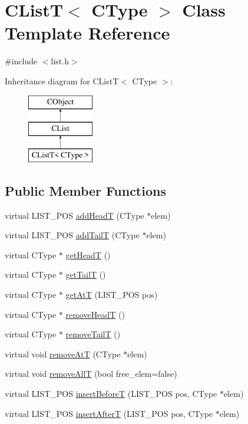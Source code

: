 \hypertarget{class_c_list_t}{\section{C\-List\-T$<$ C\-Type $>$ Class Template Reference}
\label{class_c_list_t}
}


{\ttfamily \#include $<$list.\-h$>$}

Inheritance diagram for C\-List\-T$<$ C\-Type $>$\-:\begin{figure}[H]
\begin{center}
\leavevmode
\includegraphics[height=3.000000cm]{da/d59/class_c_list_t}
\end{center}
\end{figure}
\subsection*{Public Member Functions}
\begin{DoxyCompactItemize}
\item 
virtual L\-I\-S\-T\-\_\-\-P\-O\-S \hyperlink{class_c_list_t_a1135a93b349ac4ae024e45b8fbdc2842}{add\-Head\-T} (C\-Type $\ast$elem)
\item 
virtual L\-I\-S\-T\-\_\-\-P\-O\-S \hyperlink{class_c_list_t_a580d6fa5153806358134cda4fdd7810e}{add\-Tail\-T} (C\-Type $\ast$elem)
\item 
virtual C\-Type $\ast$ \hyperlink{class_c_list_t_a4645ce0c83fb57db7b7c7b5baeff73ec}{get\-Head\-T} ()
\item 
virtual C\-Type $\ast$ \hyperlink{class_c_list_t_a3084c493b524681a3bc40be808bc5b93}{get\-Tail\-T} ()
\item 
virtual C\-Type $\ast$ \hyperlink{class_c_list_t_a18acff60ba234e5f4e6728be0c66a171}{get\-At\-T} (L\-I\-S\-T\-\_\-\-P\-O\-S pos)
\item 
virtual C\-Type $\ast$ \hyperlink{class_c_list_t_a8d5f6f7d4251425a6583f4ffe6ccdd37}{remove\-Head\-T} ()
\item 
virtual C\-Type $\ast$ \hyperlink{class_c_list_t_acb8c0cc7df7297b766065d3d89eba530}{remove\-Tail\-T} ()
\item 
virtual void \hyperlink{class_c_list_t_abf84e4b6b4cb035ea2a5c174acf8da45}{remove\-At\-T} (C\-Type $\ast$elem)
\item 
virtual void \hyperlink{class_c_list_t_a33519401fb498e0b5f64e2da041726cc}{remove\-All\-T} (bool free\-\_\-elem=false)
\item 
virtual L\-I\-S\-T\-\_\-\-P\-O\-S \hyperlink{class_c_list_t_affdeb2786698f49ea1dda928591cbc5e}{insert\-Before\-T} (L\-I\-S\-T\-\_\-\-P\-O\-S pos, C\-Type $\ast$elem)
\item 
virtual L\-I\-S\-T\-\_\-\-P\-O\-S \hyperlink{class_c_list_t_abcd6ee703a0256c5ecd6f04fd7c83e6b}{insert\-After\-T} (L\-I\-S\-T\-\_\-\-P\-O\-S pos, C\-Type $\ast$elem)
\end{DoxyCompactItemize}
